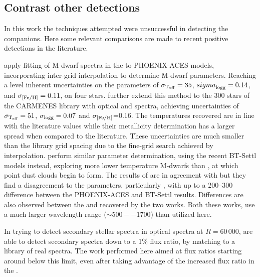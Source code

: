 \subsection{Contrast other detections}

In this work the techniques attempted were unsuccessful in detecting the companions. Here some relevant comparisons are made to recent positive detections in the literature.

\citet{passegger_fundamental_2016} apply \textchisquared{} fitting of M-dwarf spectra in the \nir{} to {PHOENIX-ACES} models, incorporating inter-grid interpolation to determine M-dwarf parameters.
Reaching a level inherent uncertainties on the parameters of \({\sigma}_{\textrm{T}_{\mathrm{eff}}}= 35\)\K{}, \({sigma}_{\textrm{logg}{}} = 0.14\), and \({\sigma}_{\feh{}}= 0.11\), on four stars.
\citet{passegger_carmenes_2018} further extend this method to the 300 stars of the {CARMENES} library with optical and \nir{} spectra, achieving uncertainties of \({\sigma}_{\textrm{T}_{\mathrm{eff}}{}}=51\)\K{}, \({\sigma}_{\textrm{logg}{}}=0.07\) and \({\sigma}_{\feh{}}\)=0.16.
The temperatures recovered are in line with the literature values while their metallicity determination has a larger spread when compared to the literature.
These uncertainties are much smaller than the library grid spacing due to the fine-grid search achieved by interpolation.
\citet{rajpurohit_exploring_2018} perform similar parameter determination, using the recent {BT-Settl} models instead, exploring more lower temperature M-dwarfs than \citet{passegger_carmens_2018}, at which point dust clouds begin to form. The results of \citet{rajpurohit_exploring_2018} are in agreement with \citep{gadios_m_2014} but they find a disagreement to the \citet{passegger_carmens_2018} parameters, particularly \Teff{}, with up to a 200--300\K{} difference between the {PHOENIX-ACES} and {BT-Settl} results. Differences are also observed between the \Logg{} and \feh{} recovered by the two works. Both these works, use a much larger wavelength range (\(\sim500--1700\)\nm{}) than utilized here.


In trying to detect secondary stellar spectra in optical spectra at \(R=60\,000\), \citep{kolbl_detection_2015} are able to detect secondary spectra down to a 1\% flux ratio, by matching to a library of real spectra. 
The work performed here aimed at flux ratios starting around below this limit, even after taking advantage of the increased flux ratio in the \nir{}.



